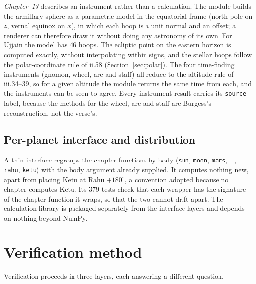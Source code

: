 \documentclass[11pt,a4paper]{article}
\begin{document}
\emph{Chapter~13} describes an instrument rather than a calculation. The module builds the armillary sphere as a parametric model in the equatorial frame (north pole on $z$, vernal equinox on $x$), in which each hoop is a unit normal and an offset; a renderer can therefore draw it without doing any astronomy of its own. For Ujjain the model has 46 hoops. The ecliptic point on the eastern horizon is computed exactly, without interpolating within signs, and the stellar hoops follow the polar-coordinate rule of ii.58 (Section~\ref{sec:polar}). The four time-finding instruments (gnomon, wheel, arc and staff) all reduce to the altitude rule of iii.34--39, so for a given altitude the module returns the same time from each, and the instruments can be seen to agree. Every instrument result carries its \texttt{source} label, because the methods for the wheel, arc and staff are Burgess's reconstruction, not the verse's.

\subsection{Per-planet interface and distribution}

A thin interface regroups the chapter functions by body (\texttt{sun}, \texttt{moon}, \texttt{mars}, \ldots, \texttt{rahu}, \texttt{ketu}) with the body argument already supplied. It computes nothing new, apart from placing Ketu at Rahu $+180^\circ$, a convention adopted because no chapter computes Ketu. Its 379 tests check that each wrapper has the signature of the chapter function it wraps, so that the two cannot drift apart. The calculation library is packaged separately from the interface layers and depends on nothing beyond NumPy.

\section{Verification method}
\label{sec:verification}

Verification proceeds in three layers, each answering a different question.
\end{document}
